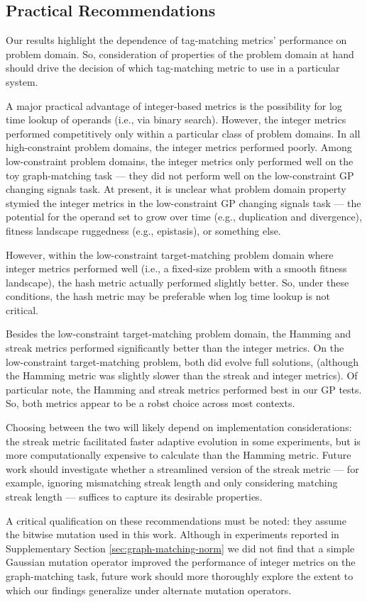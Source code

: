 \subsection{Practical Recommendations}

Our results highlight the dependence of tag-matching metrics' performance on problem domain.
So, consideration of properties of the problem domain at hand should drive the decision of which tag-matching metric to use in a particular system.

A major practical advantage of integer-based metrics is the possibility for log time lookup of operands (i.e., via binary search).
However, the integer metrics performed competitively only within a particular class of problem domains.
In all high-constraint problem domains, the integer metrics performed poorly.
Among low-constraint problem domains, the integer metrics only performed well on the toy graph-matching task --- they did not perform well on the low-constraint GP changing signals task.
At present, it is unclear what problem domain property stymied the integer metrics in the low-constraint GP changing signals task --- the potential for the operand set to grow over time (e.g., duplication and divergence), fitness landscape ruggedness (e.g., epistasis), or something else.

However, within the low-constraint target-matching problem domain where integer metrics performed well (i.e., a fixed-size problem with a smooth fitness landscape), the hash metric actually performed slightly better.
So, under these conditions, the hash metric may be preferable when log time lookup is not critical.

Besides the low-constraint target-matching problem domain, the Hamming and streak metrics performed significantly better than the integer metrics.
On the low-constraint target-matching problem, both did evolve full solutions, (although the Hamming metric was slightly slower than the streak and integer metrics).
Of particular note, the Hamming and streak metrics performed best in our GP tests.
So, both metrics appear to be a robst choice across most contexts.

Choosing between the two will likely depend on implementation considerations: the streak metric facilitated faster adaptive evolution in some experiments, but is more computationally expensive to calculate than the Hamming metric.
Future work should investigate whether a streamlined version of the streak metric --- for example, ignoring mismatching streak length and only considering matching streak length --- suffices to capture its desirable properties.

A critical qualification on these recommendations must be noted: they assume the bitwise mutation used in this work.
Although in experiments reported in Supplementary Section \ref{sec:graph-matching-norm} we did not find that a simple Gaussian mutation operator improved the performance of integer metrics on the graph-matching task, future work should more thoroughly explore the extent to which our findings generalize under alternate mutation operators.
